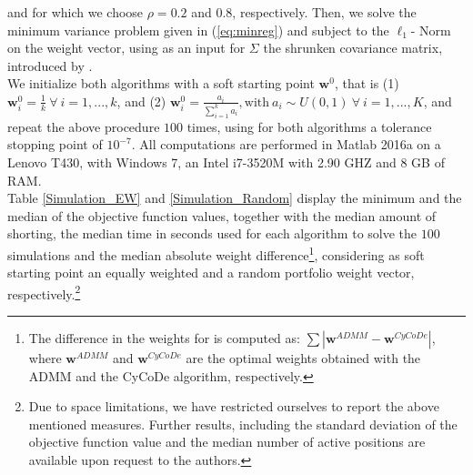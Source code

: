 \documentclass[12pt, a4paper]{article}
\newcommand{\bfw}{\boldsymbol{w} }
\begin{document}
and for which we choose $\rho=0.2$ and $0.8$, respectively. Then, we solve the minimum variance problem given in (\ref{eq:minreg}) and subject to the $\ell_{1}$- Norm on the weight vector, using as an input for $\Sigma$ the shrunken covariance matrix, introduced by \cite{Ledoit2004}.\\
We initialize both algorithms with a soft starting point $\boldsymbol{w}^{0}$, that is (1) $\boldsymbol{w}^{0}_{i} = \frac{1}{k}\ \forall \ i=1,...,k$, and (2) $\boldsymbol{w}^{0}_{i} = \frac{a_{i}}{\sum_{i=1}^{k} a_{i}}, \text{with}\ a_{i} \sim U(0, 1) \ \forall \ i=1,...,K$, and repeat the above procedure $100$ times, using for both algorithms a tolerance stopping point of $10^{-7}$. All computations are performed in Matlab 2016a on a Lenovo T430, with Windows 7, an Intel i7-3520M with 2.90 GHZ and 8 GB of RAM.\\
Table \ref{Simulation_EW} and \ref{Simulation_Random} display the minimum and the median of the objective function values, together with the median amount of shorting, the median time in seconds used for each algorithm to solve the $100$ simulations and the median absolute weight difference\footnote{The difference in the weights for is computed as: $\sum |\bfw^{ADMM} - \bfw^{CyCoDe}|$, where $\bfw^{ADMM}$ and $\bfw^{CyCoDe}$ are the optimal weights obtained with the ADMM and the CyCoDe algorithm, respectively.}, considering as soft starting point an equally weighted and a random portfolio weight vector, respectively.\footnote{Due to space limitations, we have restricted ourselves to report the above mentioned measures. Further results, including the standard deviation of the objective function value and the median number of active positions are available upon request to the authors.}
\noindent
%
\end{document}
